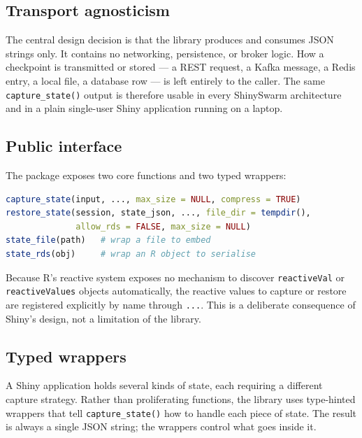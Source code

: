 \documentclass[11pt,a4paper]{article}
\begin{document}
\subsection{Transport agnosticism}

The central design decision is that the library produces and consumes JSON
strings only. It contains no networking, persistence, or broker logic. How a
checkpoint is transmitted or stored --- a REST request, a Kafka message, a Redis
entry, a local file, a database row --- is left entirely to the caller. The same
\texttt{capture\_state()} output is therefore usable in every ShinySwarm
architecture and in a plain single-user Shiny application running on a laptop.

\subsection{Public interface}

The package exposes two core functions and two typed wrappers:

\begin{lstlisting}[language=R]
capture_state(input, ..., max_size = NULL, compress = TRUE)
restore_state(session, state_json, ..., file_dir = tempdir(),
              allow_rds = FALSE, max_size = NULL)
state_file(path)   # wrap a file to embed
state_rds(obj)     # wrap an R object to serialise
\end{lstlisting}

Because R's reactive system exposes no mechanism to discover
\texttt{reactiveVal} or \texttt{reactiveValues} objects automatically, the
reactive values to capture or restore are registered explicitly by name through
\texttt{...}. This is a deliberate consequence of Shiny's design, not a
limitation of the library.

\subsection{Typed wrappers}

A Shiny application holds several kinds of state, each requiring a different
capture strategy. Rather than proliferating functions, the library uses
type-hinted wrappers that tell \texttt{capture\_state()} how to handle each
piece of state. The result is always a single JSON string; the wrappers control
what goes inside it.
\end{document}
